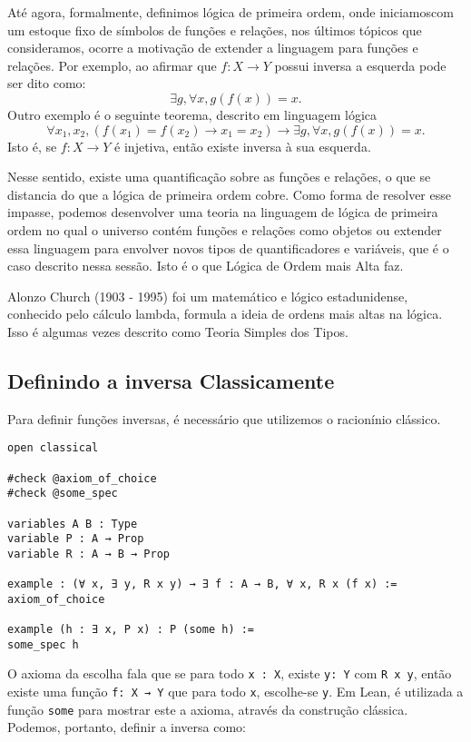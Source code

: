 Até agora, formalmente, definimos lógica de primeira ordem, onde iniciamoscom um estoque 
fixo de símbolos de funções e relações, nos últimos tópicos que  consideramos, ocorre a motivação 
de extender a linguagem para funções e relações. Por exemplo, ao afirmar que $f: X \to Y$ possui 
inversa a esquerda pode ser dito como: $$\exists g, \forall x, g(f(x)) = x.$$
Outro exemplo é o seguinte teorema, descrito em linguagem lógica 
$$\forall x_1, x_2, (f(x_1) = f(x_2) \to x_1 = x_2) \to \exists g, \forall x, g(f(x)) = x.$$
Isto é, se $f: X \to Y$ é injetiva, então existe inversa à sua esquerda.

Nesse sentido, existe uma quantificação sobre as funções e relações, o que se distancia do que a lógica 
de primeira ordem cobre. Como forma de resolver esse impasse, podemos desenvolver uma teoria na linguagem 
de lógica de primeira ordem no qual o universo contém funções e relações como objetos ou extender essa linguagem
para envolver novos tipos de quantificadores e variáveis, que é o caso descrito nessa sessão. Isto é o que Lógica
de Ordem mais Alta faz. 

Alonzo Church (1903 - 1995) foi um matemático e lógico estadunidense, conhecido pelo cálculo lambda, formula a ideia
de ordens mais altas na lógica. Isso é algumas vezes descrito como Teoria Simples dos Tipos.



\subsection{Definindo a inversa Classicamente}

Para definir funções inversas, é necessário que utilizemos o racionínio clássico. 

\begin{lstlisting}
open classical 

#check @axiom_of_choice
#check @some_spec

variables A B : Type
variable P : A → Prop   
variable R : A → B → Prop

example : (∀ x, ∃ y, R x y) → ∃ f : A → B, ∀ x, R x (f x) :=
axiom_of_choice

example (h : ∃ x, P x) : P (some h) :=
some_spec h    
\end{lstlisting}

O axioma da escolha fala que se para todo \lstinline{x : X}, existe \lstinline{y: Y} com 
\lstinline{R x y}, então existe uma função \lstinline{f: X → Y} que para todo \lstinline{x},
escolhe-se \lstinline{y}. Em Lean, é utilizada a função \lstinline{some} para mostrar este a 
axioma, através da construção clássica. Podemos, portanto, definir a inversa como: 

